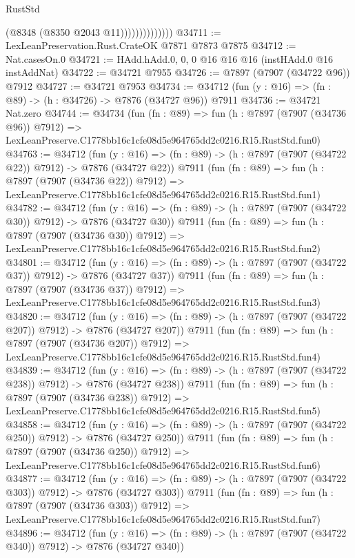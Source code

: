 \begin{lexlean}{RustStd}
\begin{coremodule}
                            (@8348 (@8350 @2043 @11))))))))))))))
@34711 := LexLeanPreservation.Rust.CrateOK @7871 @7873 @7875
@34712 := Nat.casesOn.{0}
@34721 := HAdd.hAdd.{0, 0, 0} @16 @16 @16 (instHAdd.{0} @16 instAddNat)
@34722 := @34721 @7955
@34726 := @7897 (@7907 (@34722 @96)) @7912
@34727 := @34721 @7953
@34734 := @34712 (fun (y : @16) => (fn : @89) -> (h : @34726) -> @7876 (@34727 @96)) @7911
@34736 := @34721 Nat.zero
@34744 := @34734
    (fun (fn : @89) =>
    fun (h : @7897 (@7907 (@34736 @96)) @7912) =>
    LexLeanPreserve.C1778bb16c1cfe08d5e964765dd2c0216.R15.RustStd.fun0)
@34763 := @34712
    (fun (y : @16) => (fn : @89) -> (h : @7897 (@7907 (@34722 @22)) @7912) -> @7876 (@34727 @22))
    @7911
    (fun (fn : @89) =>
    fun (h : @7897 (@7907 (@34736 @22)) @7912) =>
    LexLeanPreserve.C1778bb16c1cfe08d5e964765dd2c0216.R15.RustStd.fun1)
@34782 := @34712
    (fun (y : @16) => (fn : @89) -> (h : @7897 (@7907 (@34722 @30)) @7912) -> @7876 (@34727 @30))
    @7911
    (fun (fn : @89) =>
    fun (h : @7897 (@7907 (@34736 @30)) @7912) =>
    LexLeanPreserve.C1778bb16c1cfe08d5e964765dd2c0216.R15.RustStd.fun2)
@34801 := @34712
    (fun (y : @16) => (fn : @89) -> (h : @7897 (@7907 (@34722 @37)) @7912) -> @7876 (@34727 @37))
    @7911
    (fun (fn : @89) =>
    fun (h : @7897 (@7907 (@34736 @37)) @7912) =>
    LexLeanPreserve.C1778bb16c1cfe08d5e964765dd2c0216.R15.RustStd.fun3)
@34820 := @34712
    (fun (y : @16) => (fn : @89) -> (h : @7897 (@7907 (@34722 @207)) @7912) -> @7876 (@34727 @207))
    @7911
    (fun (fn : @89) =>
    fun (h : @7897 (@7907 (@34736 @207)) @7912) =>
    LexLeanPreserve.C1778bb16c1cfe08d5e964765dd2c0216.R15.RustStd.fun4)
@34839 := @34712
    (fun (y : @16) => (fn : @89) -> (h : @7897 (@7907 (@34722 @238)) @7912) -> @7876 (@34727 @238))
    @7911
    (fun (fn : @89) =>
    fun (h : @7897 (@7907 (@34736 @238)) @7912) =>
    LexLeanPreserve.C1778bb16c1cfe08d5e964765dd2c0216.R15.RustStd.fun5)
@34858 := @34712
    (fun (y : @16) => (fn : @89) -> (h : @7897 (@7907 (@34722 @250)) @7912) -> @7876 (@34727 @250))
    @7911
    (fun (fn : @89) =>
    fun (h : @7897 (@7907 (@34736 @250)) @7912) =>
    LexLeanPreserve.C1778bb16c1cfe08d5e964765dd2c0216.R15.RustStd.fun6)
@34877 := @34712
    (fun (y : @16) => (fn : @89) -> (h : @7897 (@7907 (@34722 @303)) @7912) -> @7876 (@34727 @303))
    @7911
    (fun (fn : @89) =>
    fun (h : @7897 (@7907 (@34736 @303)) @7912) =>
    LexLeanPreserve.C1778bb16c1cfe08d5e964765dd2c0216.R15.RustStd.fun7)
@34896 := @34712
    (fun (y : @16) => (fn : @89) -> (h : @7897 (@7907 (@34722 @340)) @7912) -> @7876 (@34727 @340))

\end{coremodule}
\end{lexlean}
